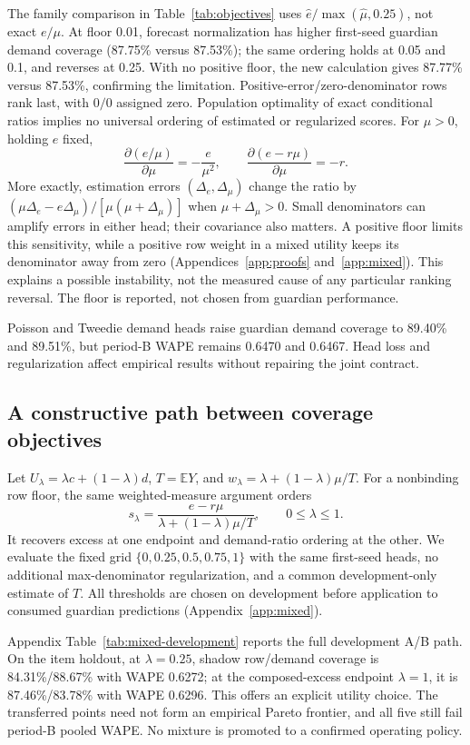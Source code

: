 \documentclass{article}
\newcommand{\E}{\mathbb{E}}
\begin{document}
The family comparison in Table~\ref{tab:objectives} uses $\hat e/\max(\hat\mu,0.25)$, not exact $e/\mu$. At floor 0.01, forecast normalization has higher first-seed guardian demand coverage (87.75\% versus 87.53\%); the same ordering holds at 0.05 and 0.1, and reverses at 0.25. With no positive floor, the new calculation gives 87.77\% versus 87.53\%, confirming the limitation. Positive-error/zero-denominator rows rank last, with $0/0$ assigned zero. Population optimality of exact conditional ratios implies no universal ordering of estimated or regularized scores. For $\mu>0$, holding $e$ fixed,
\[
 \frac{\partial(e/\mu)}{\partial\mu}=-\frac{e}{\mu^2},\qquad
 \frac{\partial(e-r\mu)}{\partial\mu}=-r.
\]
More exactly, estimation errors $(\Delta_e,\Delta_\mu)$ change the ratio by $(\mu\Delta_e-e\Delta_\mu)/[\mu(\mu+\Delta_\mu)]$ when $\mu+\Delta_\mu>0$. Small denominators can amplify errors in either head; their covariance also matters. A positive floor limits this sensitivity, while a positive row weight in a mixed utility keeps its denominator away from zero (Appendices~\ref{app:proofs} and~\ref{app:mixed}). This explains a possible instability, not the measured cause of any particular ranking reversal. The floor is reported, not chosen from guardian performance.


Poisson and Tweedie demand heads raise guardian demand coverage to 89.40\% and 89.51\%, but period-B WAPE remains 0.6470 and 0.6467. Head loss and regularization affect empirical results without repairing the joint contract.

\subsection{A constructive path between coverage objectives}
Let $U_\lambda=\lambda c+(1-\lambda)d$, $T=\E Y$, and $w_\lambda=\lambda+(1-\lambda)\mu/T$. For a nonbinding row floor, the same weighted-measure argument orders
\begin{equation}
 s_\lambda=\frac{e-r\mu}{\lambda+(1-\lambda)\mu/T},\qquad 0\leq\lambda\leq1.
 \label{eq:mixed}
\end{equation}
It recovers excess at one endpoint and demand-ratio ordering at the other. We evaluate the fixed grid $\{0,0.25,0.5,0.75,1\}$ with the same first-seed heads, no additional max-denominator regularization, and a common development-only estimate of $T$. All thresholds are chosen on development before application to consumed guardian predictions (Appendix~\ref{app:mixed}).

Appendix Table~\ref{tab:mixed-development} reports the full development A/B path. On the item holdout, at $\lambda=0.25$, shadow row/demand coverage is 84.31\%/88.67\% with WAPE 0.6272; at the composed-excess endpoint $\lambda=1$, it is 87.46\%/83.78\% with WAPE 0.6296. This offers an explicit utility choice. The transferred points need not form an empirical Pareto frontier, and all five still fail period-B pooled WAPE. No mixture is promoted to a confirmed operating policy.
\end{document}
